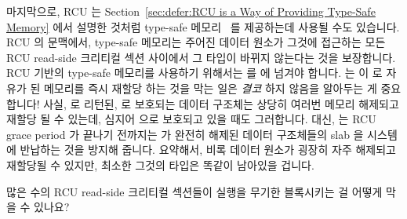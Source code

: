 마지막으로, RCU 는
Section~\ref{sec:defer:RCU is a Way of Providing Type-Safe Memory} 에서 설명한
것처럼 type-safe 메모리~\cite{Cheriton96a} 를 제공하는데 사용될 수도 있습니다.
RCU 의 문맥에서, type-safe 메모리는 주어진 데이터 원소가 그것에 접근하는 모든
RCU read-side 크리티컬 섹션 사이에서 그 타입이 바뀌지 않는다는 것을 보장합니다.
RCU 기반의 type-safe 메모리를 사용하기 위해서는  를
 에 넘겨야 합니다.
 는  이 
로 자유가 된 메모리를 즉시 재할당 하는 것을 막는 일은 \emph{결코} 하지 않음을
알아두는 게 중요합니다!
사실,  로 리턴된,  로 보호되는 데이터
구조체는 상당히 여러번 메모리 해제되고 재할당 될 수 있는데, 심지어
 으로 보호되고 있을 때도 그러합니다.
대신,  는 RCU grace period 가 끝나기 전까지는
 가 완전히 해제된 데이터 구조체들의 slab 을 시스템에
반납하는 것을 방지해 줍니다.
요약해서, 비록 데이터 원소가 굉장히 자주 해제되고 재할당될 수 있지만, 최소한
그것의 타입은 똑같이 남아있을 겁니다.
\iffalse

Finally, RCU may be used to provide
type-safe memory~\cite{Cheriton96a}, as described in
Section~\ref{sec:defer:RCU is a Way of Providing Type-Safe Memory}.
In the context of RCU, type-safe memory guarantees that a given
data element will not change type during any RCU read-side critical section
that accesses it.
To make use of RCU-based type-safe memory, pass
\co{SLAB_DESTROY_BY_RCU} to
\co{kmem_cache_create()}.
It is important to note that \co{SLAB_DESTROY_BY_RCU} will
\emph{in no way}
prevent \co{kmem_cache_alloc()} from immediately reallocating
memory that was just now freed via \co{kmem_cache_free()}!
In fact, the \co{SLAB_DESTROY_BY_RCU}-protected data structure
just returned by \co{rcu_dereference} might be freed and reallocated
an arbitrarily large number of times, even when under the protection
of \co{rcu_read_lock()}.
Instead, \co{SLAB_DESTROY_BY_RCU} operates by preventing
\co{kmem_cache_free()}
from returning a completely freed-up slab of data structures
to the system until after an RCU grace period elapses.
In short, although the data element might be freed and reallocated arbitrarily
often, at least its type will remain the same.
\fi

\QuickQuiz{}
	많은 수의 RCU read-side 크리티컬 섹션들이  실행을
	무기한 블록시키는 걸 어떻게 막을 수 있나요?
	\iffalse

